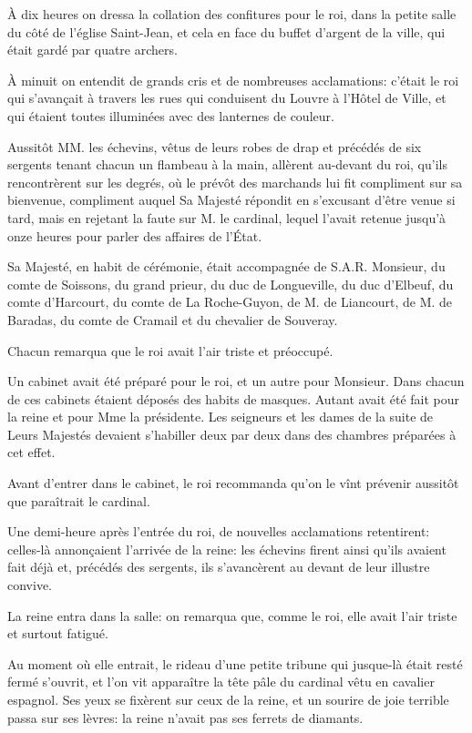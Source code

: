 À dix heures on dressa la collation des confitures pour le roi, dans la petite salle du côté de l'église Saint-Jean, et cela en face du buffet d'argent de la ville, qui était gardé par quatre archers. 

À minuit on entendit de grands cris et de nombreuses acclamations: c'était le roi qui s'avançait à travers les rues qui conduisent du Louvre à l'Hôtel de Ville, et qui étaient toutes illuminées avec des lanternes de couleur. 

Aussitôt MM. les échevins, vêtus de leurs robes de drap et précédés de six sergents tenant chacun un flambeau à la main, allèrent au-devant du roi, qu'ils rencontrèrent sur les degrés, où le prévôt des marchands lui fit compliment sur sa bienvenue, compliment auquel Sa Majesté répondit en s'excusant d'être venue si tard, mais en rejetant la faute sur M. le cardinal, lequel l'avait retenue jusqu'à onze heures pour parler des affaires de l'État. 

Sa Majesté, en habit de cérémonie, était accompagnée de S.A.R. Monsieur, du comte de Soissons, du grand prieur, du duc de Longueville, du duc d'Elbeuf, du comte d'Harcourt, du comte de La Roche-Guyon, de M. de Liancourt, de M. de Baradas, du comte de Cramail et du chevalier de Souveray. 

Chacun remarqua que le roi avait l'air triste et préoccupé. 

Un cabinet avait été préparé pour le roi, et un autre pour Monsieur. Dans chacun de ces cabinets étaient déposés des habits de masques. Autant avait été fait pour la reine et pour Mme la présidente. Les seigneurs et les dames de la suite de Leurs Majestés devaient s'habiller deux par deux dans des chambres préparées à cet effet. 

Avant d'entrer dans le cabinet, le roi recommanda qu'on le vînt prévenir aussitôt que paraîtrait le cardinal. 

Une demi-heure après l'entrée du roi, de nouvelles acclamations retentirent: celles-là annonçaient l'arrivée de la reine: les échevins firent ainsi qu'ils avaient fait déjà et, précédés des sergents, ils s'avancèrent au devant de leur illustre convive. 

La reine entra dans la salle: on remarqua que, comme le roi, elle avait l'air triste et surtout fatigué. 

Au moment où elle entrait, le rideau d'une petite tribune qui jusque-là était resté fermé s'ouvrit, et l'on vit apparaître la tête pâle du cardinal vêtu en cavalier espagnol. Ses yeux se fixèrent sur ceux de la reine, et un sourire de joie terrible passa sur ses lèvres: la reine n'avait pas ses ferrets de diamants. 

